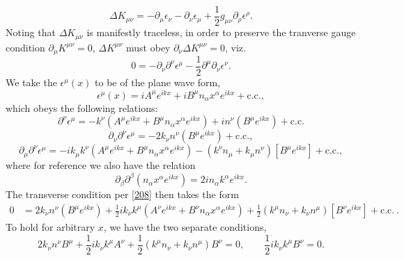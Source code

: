 \documentclass[10pt,letterpaper]{article}
\begin{document}
\begin{equation}
\Delta K_{\mu\nu} = - \partial_\mu \epsilon_\nu - \partial_\nu\epsilon_\mu + \frac12 g_{\mu\nu} \partial_\rho \epsilon^\rho.\label{207}
\end{equation}
Noting that $\Delta K_{\mu\nu}$ is manifestly traceless, in order to preserve the tranverse gauge condition $\partial_\mu K^{\mu\nu} = 0$,  $\Delta K^{\mu\nu}$ must obey $\partial_\nu \Delta K^{\mu\nu}=0$, viz.
\begin{equation}
	0 =
	-\partial_\nu \partial^\nu \epsilon^\mu - \frac12 \partial^\mu \partial_\nu \epsilon^\nu .\label{208}
\end{equation}
We take the $\epsilon^\mu(x)$ to be of the plane wave form,
\begin{equation}
\epsilon^\mu(x) = i A^\mu e^{ikx} + iB^\mu n_\alpha x^\alpha e^{ikx} + \text{c.c.},
\end{equation}
which obeys the following relations:
\begin{equation}
\partial^\nu \epsilon^\mu = - k^\nu\left(A^\mu e^{ikx} + B^\mu n_\alpha x^\alpha e^{ikx}\right)+ 
i n^\nu \left(  B^\mu  e^{ikx} \right)+ \text{c.c.}
\end{equation}
\begin{equation}
\partial_\nu \partial^\nu \epsilon^\mu = -2k_\nu n^\nu \left(B^\mu  e^{ikx}\right)+\text{c.c.},
\end{equation}
\begin{equation}
\partial_\mu \partial^\nu \epsilon^\mu = -i k_\mu k^\nu\left(A^\mu e^{ikx} +  B^\mu n_\alpha x^\alpha e^{ikx}\right)
- (k^\nu n_\mu+k_\mu n^\nu)\left[ B^\mu e^{ikx}\right] + \text{c.c.},
\end{equation}
where for reference we also have the relation
\begin{equation}
\partial_\beta \partial^\beta (n_\alpha x^\alpha e^{ikx}) = 2i n_\alpha k^\alpha e^{ikx}.
\end{equation}
The transverse condition per \eqref{208} then takes the form
\begin{align}
0 {}&= 2k_\nu n^\nu \left(B^\mu  e^{ikx}\right)+\frac12 i k_\nu k^\mu\left(A^\nu e^{ikx} +  B^\nu n_\alpha x^\alpha e^{ikx}\right)
+\frac12 (k^\mu n_\nu+k_\nu n^\mu)\left[ B^\nu e^{ikx}\right]+ \text{c.c.}\ .
\end{align}
To hold for arbitrary $x$, we have the two separate conditions,
\begin{equation}
2k_\nu n^\nu B^\mu +\frac12 ik_\nu k^\mu A^\nu + \frac12 (k^\mu n_\nu+k_\nu n^\mu)B^\nu=0,\qquad \frac12 ik_\nu k^\mu B^\nu=0.\label{2019}
\end{equation}
\end{document}
